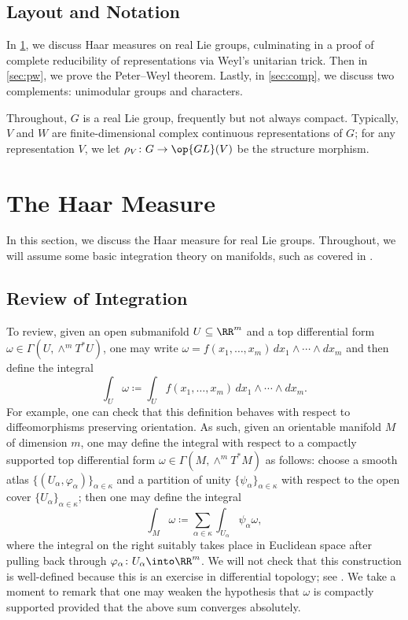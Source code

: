\documentclass{amsart}
\begin{document}
\subsection{Layout and Notation}
In \cref{sec:haar}, we discuss Haar measures on real Lie groups, culminating in a proof of complete reducibility of representations via Weyl's unitarian trick. Then in \cref{sec:pw}, we prove the Peter--Weyl theorem. Lastly, in \cref{sec:comp}, we discuss two complements: unimodular groups and characters.

Throughout, $G$ is a real Lie group, frequently but not always compact. Typically, $V$ and $W$ are finite-dimensional complex continuous representations of $G$; for any representation $V$, we let $\rho_V\colon G\to\op{GL}(V)$ be the structure morphism.

\section{The Haar Measure} \label{sec:haar}
In this section, we discuss the Haar measure for real Lie groups. Throughout, we will assume some basic integration theory on manifolds, such as covered in \cite[Chapter~16]{lee-manifolds}.

\subsection{Review of Integration} \label{subsec:integrate-manifold}
To review, given an open submanifold $U\subseteq\RR^m$ and a top differential form $\omega\in\Gamma(U,\land^mT^*U)$, one may write $\omega=f(x_1,\ldots,x_m)\,dx_1\land\cdots\land dx_m$ and then define the integral
\[\int_U\omega\coloneqq\int_Uf(x_1,\ldots,x_m)\,dx_1\land\cdots\land dx_m.\]
For example, one can check that this definition behaves with respect to diffeomorphisms preserving orientation. As such, given an orientable manifold $M$ of dimension $m$, one may define the integral with respect to a compactly supported top differential form $\omega\in\Gamma(M,\land^mT^*M)$ as follows: choose a smooth atlas $\{(U_\alpha,\varphi_\alpha)\}_{\alpha\in\kappa}$ and a partition of unity $\{\psi_\alpha\}_{\alpha\in\kappa}$ with respect to the open cover $\{U_\alpha\}_{\alpha\in\kappa}$; then one may define the integral
\[\int_M\omega\coloneqq\sum_{\alpha\in\kappa}\int_{U_\alpha}\psi_\alpha\omega,\]
where the integral on the right suitably takes place in Euclidean space after pulling back through $\varphi_\alpha\colon U_\alpha\into\RR^m$. We will not check that this construction is well-defined because this is an exercise in differential topology; see \cite[Propositions~16.3--16.5]{lee-manifolds}. We take a moment to remark that one may weaken the hypothesis that $\omega$ is compactly supported provided that the above sum converges absolutely.
\end{document}
